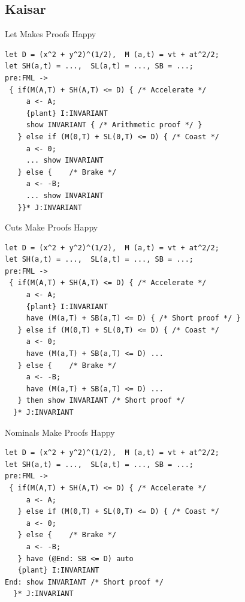 \documentclass[slidestop,aspectratio=169]{beamer}
\theoremstyle{plain}
\theoremstyle{definition}
\theoremstyle{remark}
\begin{document}
\subsection{Kaisar}
\begin{frame}[t,fragile]{Let Makes Proofs Happy}
\begin{verbatim}
let D = (x^2 + y^2)^(1/2),  M (a,t) = vt + at^2/2;
let SH(a,t) = ...,  SL(a,t) = ..., SB = ...;
pre:FML ->
 { if(M(A,T) + SH(A,T) <= D) { /* Accelerate */
     a <- A;
     {plant} I:INVARIANT
     show INVARIANT { /* Arithmetic proof */ }
   } else if (M(0,T) + SL(0,T) <= D) { /* Coast */
     a <- 0;
     ... show INVARIANT
   } else {    /* Brake */
     a <- -B;
     ... show INVARIANT
   }}* J:INVARIANT

\end{verbatim}
\end{frame}

\begin{frame}[t,fragile]{Cuts Make Proofs Happy}
\begin{verbatim}
let D = (x^2 + y^2)^(1/2),  M (a,t) = vt + at^2/2;
let SH(a,t) = ...,  SL(a,t) = ..., SB = ...;
pre:FML ->
 { if(M(A,T) + SH(A,T) <= D) { /* Accelerate */
     a <- A;
     {plant} I:INVARIANT
     have (M(a,T) + SB(a,T) <= D) { /* Short proof */ }
   } else if (M(0,T) + SL(0,T) <= D) { /* Coast */
     a <- 0;
     have (M(a,T) + SB(a,T) <= D) ...
   } else {    /* Brake */
     a <- -B;
     have (M(a,T) + SB(a,T) <= D) ...
   } then show INVARIANT /* Short proof */
  }* J:INVARIANT

\end{verbatim}
\end{frame}

\begin{frame}[t,fragile]{Nominals Make Proofs Happy}
\begin{verbatim}
let D = (x^2 + y^2)^(1/2),  M (a,t) = vt + at^2/2;
let SH(a,t) = ...,  SL(a,t) = ..., SB = ...;
pre:FML ->
 { if(M(A,T) + SH(A,T) <= D) { /* Accelerate */
     a <- A;
   } else if (M(0,T) + SL(0,T) <= D) { /* Coast */
     a <- 0;
   } else {    /* Brake */
     a <- -B;
   } have (@End: SB <= D) auto
   {plant} I:INVARIANT
End: show INVARIANT /* Short proof */
  }* J:INVARIANT


\end{verbatim}
\end{frame}


\end{document}
